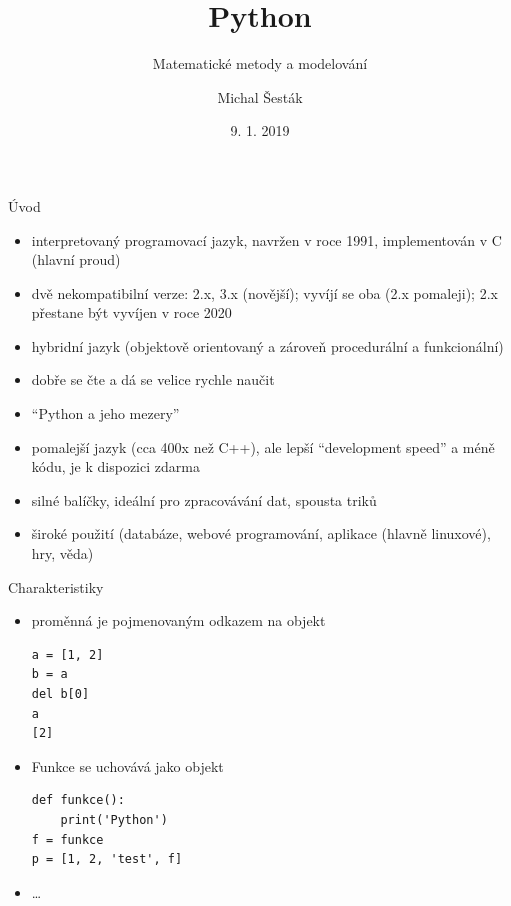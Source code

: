 \documentclass[10pt]{beamer}
\author{Michal Šesták}
\title{Python}
\subtitle{Matematické metody a modelování}
\date{9. 1. 2019}
\begin{document}
\small
\lstset{language=Python}
\maketitle


\begin{frame}{Úvod}
    \begin{itemize}
        \item interpretovaný programovací jazyk, navržen v roce 1991, implementován v C (hlavní proud)
        \item dvě nekompatibilní verze: 2.x, 3.x (novější); vyvíjí se oba (2.x pomaleji); 2.x přestane být vyvíjen v roce 2020
        \item hybridní jazyk (objektově orientovaný a zároveň procedurální a funkcionální)
        \item dobře se čte a dá se velice rychle naučit
        \item ``Python a jeho mezery''
        \item pomalejší jazyk (cca 400x než C++), ale lepší ``development speed'' a méně kódu, je k dispozici zdarma
        \item silné balíčky, ideální pro zpracovávání dat, spousta triků
        \item široké použití (databáze, webové programování, aplikace (hlavně linuxové), hry, věda) 
    \end{itemize}
\end{frame}

\begin{frame}[fragile]{Charakteristiky}
    \begin{itemize}
        \item proměnná je pojmenovaným odkazem na objekt
\begin{lstlisting}[columns=fullflexible]
a = [1, 2]
b = a
del b[0]
a
[2]
\end{lstlisting}
\item Funkce se uchovává jako objekt
    \begin{lstlisting}[columns=flexible]
def funkce():
    print('Python')
f = funkce
p = [1, 2, 'test', f]
\end{lstlisting}
\item \dots
    \end{itemize}
\end{frame}
\end{document}
